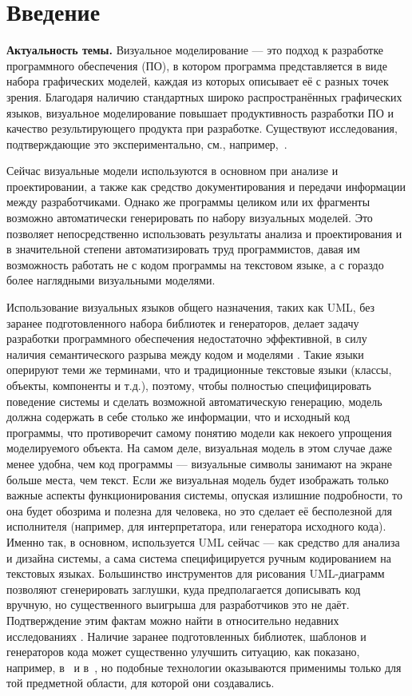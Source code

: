 \chapter*{Введение}
\textbf{Актуальность темы.}
Визуальное моделирование --- это подход к разработке программного обеспечения (ПО), в котором программа представляется 
в виде набора графических моделей, каждая из которых описывает её с разных точек 
зрения. Благодаря наличию стандартных широко распространённых графических языков, 
визуальное моделирование повышает продуктивность разработки ПО и качество результирующего 
продукта при разработке. Существуют исследования, подтверждающие это экспериментально, см., 
например,~\cite{heijstek2009empirical, baker2005model}.

Сейчас визуальные модели используются в основном при анализе и проектировании, 
а также как средство документирования и передачи информации между 
разработчиками. Однако же программы целиком или их фрагменты возможно 
автоматически генерировать по набору визуальных моделей. Это позволяет 
непосредственно использовать результаты анализа и проектирования и в 
значительной степени автоматизировать труд программистов, давая им возможность 
работать не с кодом программы на текстовом языке, а с гораздо более наглядными 
визуальными моделями. 

Использование визуальных языков общего назначения, таких как \ac{UML}, без заранее 
подготовленного набора библиотек и генераторов, делает задачу разработки 
программного обеспечения недостаточно эффективной, в силу наличия семантического разрыва между кодом и моделями 
\cite{selic2003pragmatics, koznov2008osnovy}. Такие языки оперируют теми же терминами, что и традиционные текстовые
языки (классы, объекты, компоненты и т.д.), поэтому, чтобы полностью специфицировать 
поведение системы и сделать возможной автоматическую генерацию, модель должна 
содержать в себе столько же информации, что и исходный код программы, что 
противоречит самому понятию модели как некоего упрощения моделируемого объекта. 
На самом деле, визуальная модель в этом случае даже менее удобна, чем код 
программы --- визуальные символы занимают на экране больше места, чем текст. 
Если же визуальная модель будет изображать только важные аспекты 
функционирования системы, опуская излишние подробности, то она будет 
обозрима и полезна для человека, но это сделает её бесполезной для 
исполнителя (например, для интерпретатора, или генератора исходного кода). 
Именно так, в основном, используется \ac{UML} сейчас --- как средство для анализа и 
дизайна системы, а сама система специфицируется ручным кодированием на текстовых 
языках. Большинство инструментов для рисования UML-диаграмм позволяют 
сгенерировать заглушки, куда предполагается дописывать код вручную, но 
существенного выигрыша для разработчиков это не даёт. Подтверждение этим фактам 
можно найти в относительно недавних исследованиях 
\cite{mohagheghi2013empirical, chen2012methodology}. Наличие заранее подготовленных 
библиотек, шаблонов и генераторов кода может существенно улучшить ситуацию, как показано,
например, в~\cite{baker2005model} и в~\cite{swithinbank2005patterns}, но подобные 
технологии оказываются применимы только для той предметной области, для которой они создавались.

